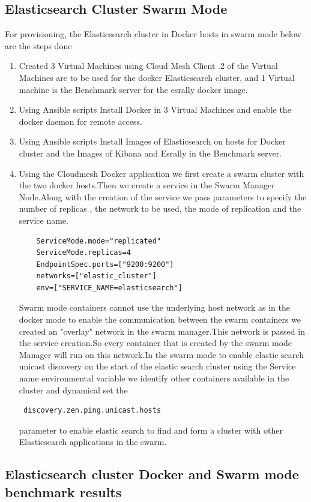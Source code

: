 \documentclass[9pt,twocolumn,twoside]{../../styles/osajnl}
\begin{document}
 \subsection{Elasticsearch Cluster Swarm Mode}
  For provisioning, the Elasticsearch cluster in Docker hosts in swarm mode below are the steps done
\begin{enumerate}
\item Created 3 Virtual Machines using Cloud Mesh Client .2 of the Virtual Machines are to be used for the docker Elasticsearch cluster, and 1 Virtual machine is the Benchmark server for the esrally docker image.
\item Using Ansible scripts Install Docker in 3 Virtual Machines and enable the docker daemon for remote access.
\item Using Ansible scripts Install Images of Elasticsearch on hosts for Docker cluster and the Images of Kibana and Esrally in the Benchmark server.
\item Using the Cloudmesh Docker application we first create a swarm cluster with the two docker hosts.Then we create a service in the Swarm  Manager Node.Along with the creation of the service we pass parameters to specify the number of replicas , the network to be used, the mode of replication and the service name.
\begin{verbatim}
    ServiceMode.mode="replicated" 
    ServiceMode.replicas=4 
    EndpointSpec.ports=["9200:9200"] 
    networks=["elastic_cluster"] 
    env=["SERVICE_NAME=elasticsearch"]
\end{verbatim}
Swarm mode containers cannot use the underlying host network as in the docker mode to enable the communication between the swarm containers we created an "overlay" network in the swarm manager.This network is passed in the service creation.So every container that is created by the swarm mode Manager will run on this network.In the swarm mode to enable elastic search unicast discovery on the start of the elastic search cluster using the Service name environmental variable we identify other containers available in the cluster and dynamical set the \begin{verbatim} discovery.zen.ping.unicast.hosts \end{verbatim} parameter to enable elastic search to find and form a cluster with other Elasticsearch applications in the swarm.

\end{enumerate}

 \subsection{Elasticsearch cluster Docker and Swarm mode benchmark results}
\end{document}
